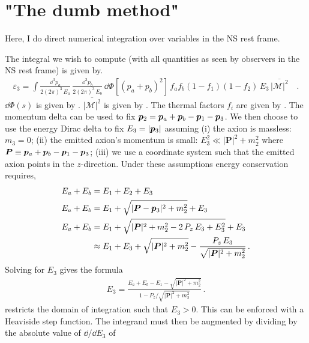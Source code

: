 \section{"The dumb method"}
Here, I do direct numerical integration over variables in the NS rest frame.

The integral we wish to compute (with all quantities as seen by observers in the NS rest frame) is given by.
\begin{align}
    \varepsilon_3 = 
       \int \frac{\dd^3 p_a}{2(2\pi)^3\, E_a} 
    \, \frac{\dd^3 p_b}{2(2\pi)^3\, E_b} 
    \, \dd \Phi[(p_a + p_b)^2]
    \, f_a f_b (1 - f_1) (1 - f_2)
    \, E_3
    \, \overline{|\mathcal{M}|^2} \quad .
\end{align}
$\dd \Phi(s)$ is given by . $\overline{|\mathcal{M}|^2}$ is given by . The thermal factors $f_i$ are given by . The momentum delta can be used to fix $\pvec[2] = \pvec[a] + \pvec[b] - \pvec[1] - \pvec[3]$. 
We then choose to use the energy Dirac delta to fix $E_3 = |\pvec[3]|$ assuming (i) the axion is massless: $m_3 = 0$; (ii) the emitted axion's momentum is small: $E_3^2 \ll |\bm{P}|^2 + m_2^2$ where $\bm{P} \equiv \pvec[a] + \pvec[b] - \pvec[1] - \pvec[3]$; (iii) we use a coordinate system such that the emitted axion points in the $z$-direction. 
Under these assumptions energy conservation requires,
\begin{align}
    E_a + E_b &= E_1 + E_2 + E_3 \\
    E_a + E_b &= E_1 + \sqrt{|\bm{P} - \pvec[3]|^2 + m_2^2} + E_3 \\
    \label{eq:dumb-method-energy-conservation}
    E_a + E_b &= E_1 +
        \sqrt{|\bm{P}|^2 + m_2^2 -
            2 \, P_z \, E_3 + E_3^2
            }  +
        E_3 \\
    &\approx
        E_1 + E_3 + \sqrt{|\bm{P}|^2 + m_2^2} -
        \frac{P_z \, E_3}{\sqrt{|\bm{P}|^2 + m_2^2}} \, .
\end{align}
Solving for $E_3$ gives the formula
\begin{align}
    \label{eq:pmag3-formula}
    E_3 = \frac{E_a + E_b - E_1 - \sqrt{|\bm{P}|^2 + m_2^2}}{1 - P_z / \sqrt{|\bm{P}|^2 + m_2^2}} \, .
\end{align}
 restricts the domain of integration such that $E_3 > 0$. 
This can be enforced with a Heaviside step function. 
The integrand must then be augmented by dividing by the absolute value of $\dd / \dd E_3$ of 
